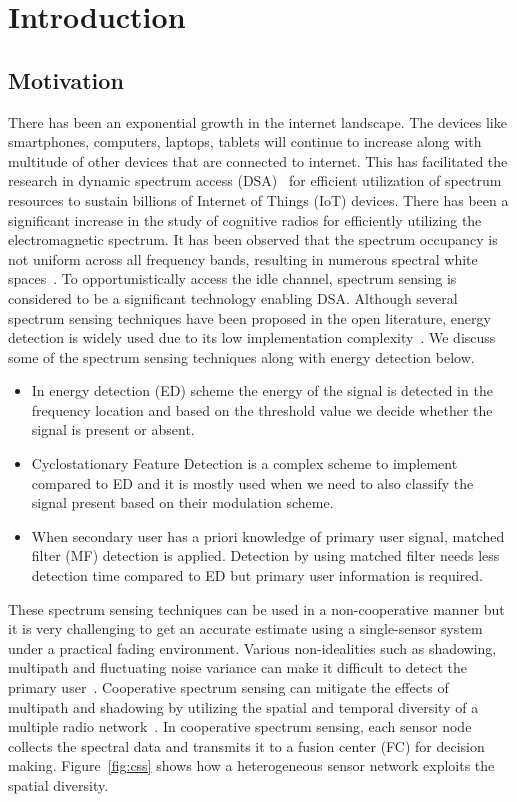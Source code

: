 \chapter{Introduction}
\label{ch:introduction}
\section{Motivation}
There has been an exponential growth in the internet landscape. The devices like smartphones, computers, laptops, tablets will continue to increase along with multitude of other devices that are connected to internet. This has facilitated the research in dynamic spectrum access (DSA)~\cite{arhtn2,arhtn3} for efficient utilization of spectrum resources to sustain billions of Internet of Things (IoT) devices. There has been a significant increase in the study of cognitive radios for efficiently utilizing the electromagnetic spectrum. It has been observed that the spectrum occupancy is not uniform across all frequency bands, resulting in numerous spectral white spaces~\cite{bookhtn1}. To opportunistically access the idle channel, spectrum sensing is considered to be a significant technology enabling DSA. Although several spectrum sensing techniques have been proposed in the open literature, energy detection is widely used due to its low implementation complexity~\cite{arhtn4}. We discuss some of the spectrum sensing techniques along with energy detection below.
\begin{itemize}
\item In energy detection (ED) scheme the energy of the signal is detected in the frequency location and based on the threshold value we decide whether the signal is present or absent.

\item Cyclostationary Feature Detection is a complex scheme to implement compared to ED and it is mostly used when we need to also classify the signal present based on their modulation scheme.

\item When secondary user has a priori knowledge of primary user signal, matched  filter (MF)  detection  is  applied. Detection by using matched filter needs less detection time compared to ED but primary user information is required.
\end{itemize}

These spectrum sensing techniques can be used in a non-cooperative manner but it is very challenging to get an accurate estimate using a single-sensor system under a practical fading environment. Various non-idealities such as shadowing, multipath and fluctuating noise variance can make it difficult to detect the primary user~\cite{inphtn5,inphtn6}. Cooperative spectrum sensing can mitigate the effects of multipath and shadowing by utilizing the spatial and temporal diversity of a multiple radio network~\cite{inphtn7,inphtn8}. In cooperative spectrum sensing, each sensor node collects the spectral data and transmits it to a fusion center (FC) for decision making. Figure~\ref{fig:css} shows how a heterogeneous sensor network exploits the spatial diversity. 

